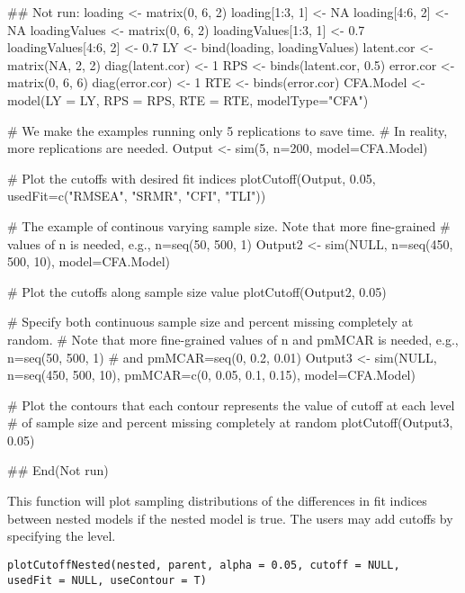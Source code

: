 \documentclass[a4paper]{book}
\begin{document}
%
\begin{Examples}
\begin{ExampleCode}
## Not run: 
loading <- matrix(0, 6, 2)
loading[1:3, 1] <- NA
loading[4:6, 2] <- NA
loadingValues <- matrix(0, 6, 2)
loadingValues[1:3, 1] <- 0.7
loadingValues[4:6, 2] <- 0.7
LY <- bind(loading, loadingValues)
latent.cor <- matrix(NA, 2, 2)
diag(latent.cor) <- 1
RPS <- binds(latent.cor, 0.5)
error.cor <- matrix(0, 6, 6)
diag(error.cor) <- 1
RTE <- binds(error.cor)
CFA.Model <- model(LY = LY, RPS = RPS, RTE = RTE, modelType="CFA")

# We make the examples running only 5 replications to save time.
# In reality, more replications are needed.
Output <- sim(5, n=200, model=CFA.Model) 

# Plot the cutoffs with desired fit indices
plotCutoff(Output, 0.05, usedFit=c("RMSEA", "SRMR", "CFI", "TLI"))

# The example of continous varying sample size. Note that more fine-grained 
# values of n is needed, e.g., n=seq(50, 500, 1)
Output2 <- sim(NULL, n=seq(450, 500, 10), model=CFA.Model)

# Plot the cutoffs along sample size value
plotCutoff(Output2, 0.05)

# Specify both continuous sample size and percent missing completely at random. 
# Note that more fine-grained values of n and pmMCAR is needed, e.g., n=seq(50, 500, 1) 
# and pmMCAR=seq(0, 0.2, 0.01)
Output3 <- sim(NULL, n=seq(450, 500, 10), pmMCAR=c(0, 0.05, 0.1, 0.15), model=CFA.Model)

# Plot the contours that each contour represents the value of cutoff at each level
# of sample size and percent missing completely at random
plotCutoff(Output3, 0.05)

## End(Not run)
\end{ExampleCode}
\end{Examples}
%
\begin{Description}\relax
This function will plot sampling distributions of the differences in fit indices between nested models if the nested model is true. The users may add cutoffs by specifying the  level.
\end{Description}
%
\begin{Usage}
\begin{verbatim}
plotCutoffNested(nested, parent, alpha = 0.05, cutoff = NULL, 
usedFit = NULL, useContour = T)
\end{verbatim}
\end{Usage}
\end{document}
